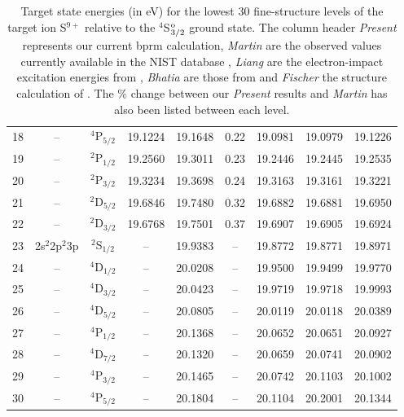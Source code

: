 \begin{table}[hbt]
\begin{center}
\begin{tabular}{@{} l *4c c *3c @{}}
       \multicolumn{1}{c}{18} & -- & $^4$P$_{5/2}$ & 19.1224 & 19.1648 & 0.22 & 19.0981 & 19.0979 & 19.1226\\       
       \multicolumn{1}{c}{19} & -- & $^2$P$_{1/2}$ & 19.2560 & 19.3011 & 0.23 & 19.2446 & 19.2445 & 19.2535\\       
       \multicolumn{1}{c}{20} & -- & $^2$P$_{3/2}$ & 19.3234 & 19.3698 & 0.24 & 19.3163 & 19.3161 & 19.3221\\       
       \multicolumn{1}{c}{21} & -- & $^2$D$_{5/2}$ & 19.6846 & 19.7480 & 0.32 & 19.6882 & 19.6881 & 19.6950\\
        \multicolumn{1}{c}{22} & -- & $^2$D$_{3/2}$ & 19.6768 & 19.7501 & 0.37 & 19.6907 & 19.6905 & 19.6924\\
        \multicolumn{1}{c}{23} & 2s$^2$2p$^2$3p & $^2$S$_{1/2}$ & -- & 19.9383 & -- & 19.8772 & 19.8771 & 19.8971\\ 
        \multicolumn{1}{c}{24} & -- & $^4$D$_{1/2}$ & -- & 20.0208 & -- & 19.9500 & 19.9499 & 19.9770\\
        \multicolumn{1}{c}{25} & -- & $^4$D$_{3/2}$ & -- & 20.0423 & -- & 19.9719 & 19.9718 & 19.9993\\
        \multicolumn{1}{c}{26} & -- & $^4$D$_{5/2}$ & -- & 20.0805 & -- & 20.0119 & 20.0118 & 20.0389\\
        \multicolumn{1}{c}{27} & -- & $^4$P$_{1/2}$ & -- & 20.1368 & -- & 20.0652 & 20.0651 & 20.0927\\
        \multicolumn{1}{c}{28} & -- & $^4$D$_{7/2}$ & -- & 20.1320 & -- & 20.0659 & 20.0741 & 20.0902\\
        \multicolumn{1}{c}{29} & -- & $^4$P$_{3/2}$ & -- & 20.1465 & -- & 20.0742 & 20.1103 & 20.1002\\
        \multicolumn{1}{c}{30} & -- & $^4$P$_{5/2}$ & -- & 20.1804 & -- & 20.1104 & 20.2001 & 20.1344\\        
\bottomrule
 \end{tabular}
 \caption{Target state energies (in eV) for the lowest 30 fine-structure levels of the target ion S$^{9+}$ relative to the $^4$S$^{\rm o}_{3/2}$ ground state. The column header \textit{Present} represents our current {\sc bprm} calculation, \textit{Martin} are the observed values currently available in the NIST database \citep{1990JPCRD..19..821M}, \textit{Liang} are the electron-impact excitation energies from \cite{0004-637X-762-1-53}, \textit{Bhatia} are those from \cite{2003ADNDT..85..169B} and \textit{Fischer} the structure calculation of \cite{2004ADNDT..87....1F}. The $\%$ change between our \textit{Present} results and \textit{Martin} has also been listed between each level. \label{tab:sul_energy}}
 \end{center}
\end{table}



